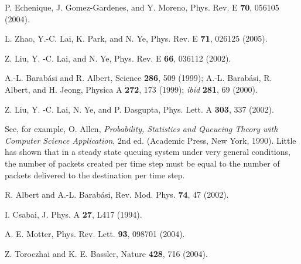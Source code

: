 \documentclass[aps,prl,twocolumn,superscriptaddress,showpacs]{revtex4}
\begin{document}
\begin{references}
P. Echenique, J. Gomez-Gardenes, and Y. Moreno, Phys. Rev. E {\bf
70}, 056105 (2004).

L. Zhao, Y.-C. Lai, K. Park, and N. Ye, Phys. Rev. E {\bf 71},
026125 (2005).

Z. Liu, Y. -C. Lai, and N. Ye, Phys. Rev. E {\bf 66}, 036112 (2002).

A.-L. Barab\'{a}si and R. Albert, Science {\bf 286}, 509 (1999);
A.-L. Barab\'{a}si, R. Albert, and H. Jeong, Physica A {\bf 272}, 173 (1999);
{\it ibid} {\bf 281}, 69 (2000).

Z. Liu, Y. -C. Lai, N. Ye, and P. Dasgupta, Phys. Lett. A {\bf 303},
337 (2002).

 See, for example, O. Allen, {\it
Probability, Statistics and Queueing Theory with Computer Science
Application}, 2nd ed. (Academic Press, New York, 1990). Little has
shown that in a steady state queuing system under very general
conditions, the number of packets created per time step must be
equal to the number of packets delivered to the destination per
time step.

R. Albert and A.-L. Barab\'{a}si, Rev. Mod. Phys. {\bf 74}, 47
(2002).

I. Csabai, J. Phys. A {\bf 27}, L417 (1994).

A. E. Motter, Phys. Rev. Lett. {\bf 93}, 098701 (2004).

Z. Toroczhai and K. E. Bassler, Nature {\bf 428}, 716 (2004).

\end{references}
\end{document}
